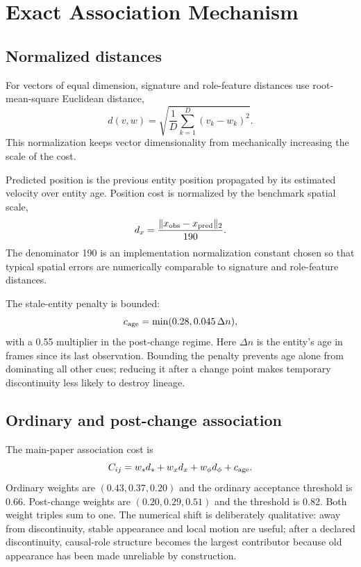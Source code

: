 \documentclass[10pt,journal,onecolumn]{IEEEtran}
\begin{document}
\section{Exact Association Mechanism}
\subsection{Normalized distances}
For vectors of equal dimension, signature and role-feature distances use root-mean-square Euclidean distance,
\begin{equation}
d(v,w)=\sqrt{\frac{1}{D}\sum_{k=1}^D(v_k-w_k)^2}.
\label{eq:rms}
\end{equation}
This normalization keeps vector dimensionality from mechanically increasing the scale of the cost.

Predicted position is the previous entity position propagated by its estimated velocity over entity age. Position cost is normalized by the benchmark spatial scale,
\begin{equation}
d_x=\frac{\|x_{\rm obs}-x_{\rm pred}\|_2}{190}.
\label{eq:pos}
\end{equation}
The denominator 190 is an implementation normalization constant chosen so that typical spatial errors are numerically comparable to signature and role-feature distances.

The stale-entity penalty is bounded:
\begin{equation}
c_{\rm age}=\min(0.28,0.045\,\Delta n),
\label{eq:age}
\end{equation}
with a 0.55 multiplier in the post-change regime. Here $\Delta n$ is the entity's age in frames since its last observation. Bounding the penalty prevents age alone from dominating all other cues; reducing it after a change point makes temporary discontinuity less likely to destroy lineage.

\subsection{Ordinary and post-change association}
The main-paper association cost is
\begin{equation}
C_{ij}=w_s d_s+w_xd_x+w_\phi d_\phi+c_{\rm age}.
\end{equation}
Ordinary weights are $(0.43,0.37,0.20)$ and the ordinary acceptance threshold is 0.66. Post-change weights are $(0.20,0.29,0.51)$ and the threshold is 0.82. Both weight triples sum to one. The numerical shift is deliberately qualitative: away from discontinuity, stable appearance and local motion are useful; after a declared discontinuity, causal-role structure becomes the largest contributor because old appearance has been made unreliable by construction.
\end{document}
